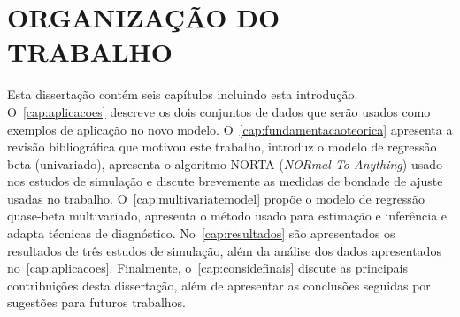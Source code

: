 \section{ORGANIZAÇÃO DO TRABALHO}

Esta dissertação contém seis capítulos incluindo esta introdução.
O~\autoref{cap:aplicacoes} descreve os dois conjuntos de dados que serão
usados como exemplos de aplicação no novo modelo.
O~\autoref{cap:fundamentacaoteorica} apresenta a revisão bibliográfica
que motivou este trabalho, introduz o modelo de regressão beta
(univariado), apresenta o algoritmo NORTA (\textit{NORmal To Anything})
usado nos estudos de simulação e discute brevemente as medidas de
bondade de ajuste usadas no trabalho. O~\autoref{cap:multivariatemodel}
propõe o modelo de regressão quase-beta multivariado, apresenta o método
usado para estimação e inferência e adapta técnicas de diagnóstico.
No~\autoref{cap:resultados} são apresentados os resultados de três
estudos de simulação, além da análise dos dados apresentados
no~\autoref{cap:aplicacoes}. Finalmente, o~\autoref{cap:considefinais}
discute as principais contribuições desta dissertação, além de
apresentar as conclusões seguidas por sugestões para futuros trabalhos.

